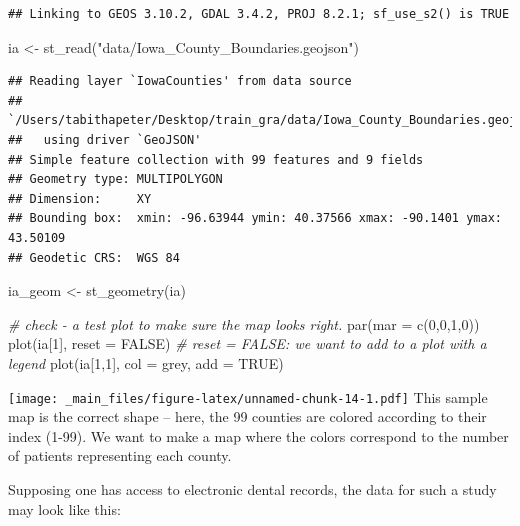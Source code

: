 \documentclass[
]{book}
\newenvironment{Shaded}{\begin{snugshade}}{\end{snugshade}}
\newcommand{\AttributeTok}[1]{\textcolor[rgb]{0.77,0.63,0.00}{#1}}
\newcommand{\CommentTok}[1]{\textcolor[rgb]{0.56,0.35,0.01}{\textit{#1}}}
\newcommand{\ConstantTok}[1]{\textcolor[rgb]{0.00,0.00,0.00}{#1}}
\newcommand{\DecValTok}[1]{\textcolor[rgb]{0.00,0.00,0.81}{#1}}
\newcommand{\FunctionTok}[1]{\textcolor[rgb]{0.00,0.00,0.00}{#1}}
\newcommand{\NormalTok}[1]{#1}
\newcommand{\OtherTok}[1]{\textcolor[rgb]{0.56,0.35,0.01}{#1}}
\newcommand{\StringTok}[1]{\textcolor[rgb]{0.31,0.60,0.02}{#1}}
\begin{document}
\begin{verbatim}
## Linking to GEOS 3.10.2, GDAL 3.4.2, PROJ 8.2.1; sf_use_s2() is TRUE
\end{verbatim}

\begin{Shaded}
\begin{Highlighting}[]
\NormalTok{ia }\OtherTok{\textless{}{-}} \FunctionTok{st\_read}\NormalTok{(}\StringTok{"data/Iowa\_County\_Boundaries.geojson"}\NormalTok{)}
\end{Highlighting}
\end{Shaded}

\begin{verbatim}
## Reading layer `IowaCounties' from data source 
##   `/Users/tabithapeter/Desktop/train_gra/data/Iowa_County_Boundaries.geojson' 
##   using driver `GeoJSON'
## Simple feature collection with 99 features and 9 fields
## Geometry type: MULTIPOLYGON
## Dimension:     XY
## Bounding box:  xmin: -96.63944 ymin: 40.37566 xmax: -90.1401 ymax: 43.50109
## Geodetic CRS:  WGS 84
\end{verbatim}

\begin{Shaded}
\begin{Highlighting}[]
\NormalTok{ia\_geom }\OtherTok{\textless{}{-}} \FunctionTok{st\_geometry}\NormalTok{(ia)}


\CommentTok{\# check {-} a test plot to make sure the map looks right. }
\FunctionTok{par}\NormalTok{(}\AttributeTok{mar =} \FunctionTok{c}\NormalTok{(}\DecValTok{0}\NormalTok{,}\DecValTok{0}\NormalTok{,}\DecValTok{1}\NormalTok{,}\DecValTok{0}\NormalTok{))}
\FunctionTok{plot}\NormalTok{(ia[}\DecValTok{1}\NormalTok{], }\AttributeTok{reset =} \ConstantTok{FALSE}\NormalTok{) }\CommentTok{\# reset = FALSE: we want to add to a plot with a legend}
\FunctionTok{plot}\NormalTok{(ia[}\DecValTok{1}\NormalTok{,}\DecValTok{1}\NormalTok{], }\AttributeTok{col =} \StringTok{\textquotesingle{}grey\textquotesingle{}}\NormalTok{, }\AttributeTok{add =} \ConstantTok{TRUE}\NormalTok{)}
\end{Highlighting}
\end{Shaded}

\texttt{[image: \_main\_files/figure-latex/unnamed-chunk-14-1.pdf]}
This sample map is the correct shape -- here, the 99 counties are colored according to their index (1-99). We want to make a map where the colors correspond to the number of patients representing each county.

Supposing one has access to electronic dental records, the data for such a study may look like this:
\end{document}
